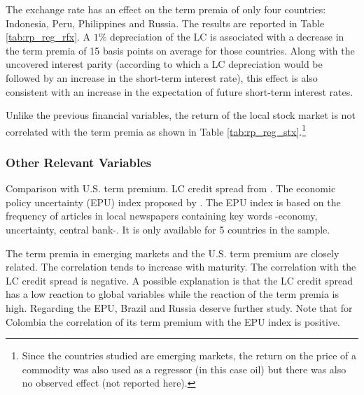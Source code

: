 The exchange rate has an effect on the term premia of only four countries: Indonesia, Peru, Philippines and Russia. The results are reported in Table \ref{tab:rp_reg_rfx}. A $1\%$ depreciation of the LC is associated with a decrease in the term premia of 15 basis points on average for those countries. Along with the uncovered interest parity (according to which a LC depreciation would be followed by an increase in the short-term interest rate), this effect is also consistent with an increase in the expectation of future short-term interest rates.

Unlike the previous financial variables, the return of the local stock market is not correlated with the term premia as shown in Table \ref{tab:rp_reg_stx}.\footnote{Since the countries studied are emerging markets, the return on the price of a commodity was also used as a regressor (in this case oil) but there was also no observed effect (not reported here).}

\subsubsection{Other Relevant Variables}
Comparison with U.S. term premium. LC credit spread from \cite{DuSchreger:2016a}. The economic policy uncertainty (EPU) index proposed by \cite{BakerBloomDavis:2016}. The EPU index is based on the frequency of articles in local newspapers containing key words -economy, uncertainty, central bank-. It is only available for 5 countries in the sample.
	

The term premia in emerging markets and the U.S. term premium are closely related. The correlation tends to increase with maturity. The correlation with the LC credit spread is negative. A possible explanation is that the LC credit spread has a low reaction to global variables while the reaction of the term premia is high. Regarding the EPU, Brazil and Russia deserve further study. Note that for Colombia the correlation of its term premium with the EPU index is positive.

